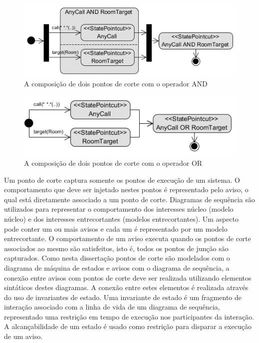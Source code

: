 \begin{figure}[h]
	\centering
	\includegraphics{img/pointcut_definition_and.png}
	\caption{A composição de dois pontos de corte com o operador AND}\label{fig:pointcut_definition_and}
\end{figure}

\begin{figure}[h]
	\centering
	\includegraphics{img/pointcut_definition_or.png}
	\caption{A composição de dois pontos de corte com o operador OR}\label{fig:pointcut_definition_or}
\end{figure}

Um ponto de corte captura somente os pontos de execução de um sistema. O comportamento que deve ser injetado nestes pontos é representado pelo aviso,
o qual está diretamente associado a um ponto de corte. Diagramas de sequência são utilizados para representar o comportamento dos interesses núcleo
(modelo núcleo) e dos interesses entrecortantes (modelos entrecortantes). Um aspecto pode conter um ou mais avisos e cada um é representado por um
modelo entrecortante. O comportamento de um aviso executa quando os pontos de corte associados ao mesmo são satisfeitos, isto é, todos os pontos de
junção são capturados. Como nesta dissertação pontos de corte são modelados com o diagrama de máquina de estados e avisos com o diagrama de sequência,
a conexão entre avisos com pontos de corte deve ser realizada utilizando elementos sintáticos destes diagramas. A conexão entre estes elementos é
realizada através do uso de invariantes de estado. Uma invariante de estado é um fragmento de interação associado com a linha de vida de um diagrama
de sequência, representado uma restrição em tempo de execução nos participantes da interação. A alcançabilidade de um estado é usado como restrição
para disparar a execução de um aviso. 

